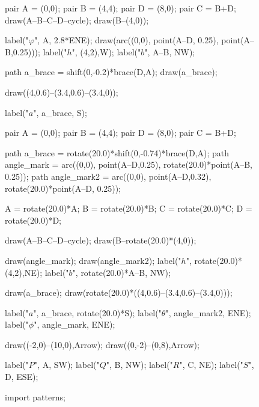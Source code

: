 \documentclass[../gatm.tex]{subfiles}
\begin{document}
\begin{figure}[h]
	\begin{center}
		\begin{minipage}[b]{0.3\textwidth}
			\centering
			\begin{asy}[width=0.9\textwidth]
				pair A = (0,0);
				pair B = (4,4);
				pair D = (8,0);
				pair C = B+D;
				draw(A--B--C--D--cycle);
				draw(B--(4,0));
				
				label("$\varphi$", A, 2.8*ENE);
				draw(arc((0,0), point(A--D, 0.25), point(A--B,0.25)));
				label("$h$", (4,2),W);
				label("$b$", A--B, NW);
				
				path a_brace = shift(0,-0.2)*brace(D,A);
				draw(a_brace);
				
				draw((4,0.6)--(3.4,0.6)--(3.4,0));
				
				label("$a$", a_brace, S);
			\end{asy}
		\end{minipage}
		\hfill
		\begin{minipage}[b]{0.3\textwidth}
			\centering
			\begin{asy}[width=0.7\textwidth]
				pair A = (0,0);
				pair B = (4,4);
				pair D = (8,0);
				pair C = B+D;
				
				path a_brace = rotate(20.0)*shift(0,-0.74)*brace(D,A);
				path angle_mark = arc((0,0), point(A--D,0.25), rotate(20.0)*point(A--B, 0.25));
				path angle_mark2 = arc((0,0), point(A--D,0.32), rotate(20.0)*point(A--D, 0.25));
				
				A = rotate(20.0)*A;
				B = rotate(20.0)*B;
				C = rotate(20.0)*C;
				D = rotate(20.0)*D;
				
				draw(A--B--C--D--cycle);
				draw(B--rotate(20.0)*(4,0));
				
				draw(angle_mark);
				draw(angle_mark2);
				label("$h$", rotate(20.0)*(4,2),NE);
				label("$b$", rotate(20.0)*A--B, NW);
				
				draw(a_brace);
				draw(rotate(20.0)*((4,0.6)--(3.4,0.6)--(3.4,0)));
				
				label("$a$", a_brace, rotate(20.0)*S);
				label("$\theta$", angle_mark2, ENE);
				label("$\phi$", angle_mark, ENE);
				
				draw((-2,0)--(10,0),Arrow);
				draw((0,-2)--(0,8),Arrow);
				
				label("$P$", A, SW);
				label("$Q$", B, NW);
				label("$R$", C, NE);
				label("$S$", D, ESE);
			\end{asy}
		\end{minipage}
		\hfill
		\begin{minipage}[b]{0.3\textwidth}
			\centering
			\begin{asy}[width=0.9\textwidth]
				import patterns;
				

\end{asy}
\end{minipage}
\end{center}
\end{figure}
\end{document}
